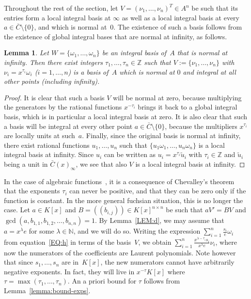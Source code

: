 \documentclass[final,1p,times,authoryear]{elsarticle}
\newtheorem{lemma}[theorem]{Lemma}
\let\set\mathbb
\begin{document}
Throughout the rest of the section, let $V = (\nu_1, \ldots, \nu_n)^T\in A^n$ be such that its entries
form a local integral basis at $\infty$ as well as a local integral basis at every $a\in\bar C\setminus\{0\}$,
and which is normal at~$0$.
The existence of such a basis follows from the existence of global integral bases that are normal at infinity,
as follows.

\begin{lemma}\label{LM:CB}
Let $W =\{\omega_1, \ldots, \omega_n\}$ be an integral basis of~$A$ that is normal at infinity. Then
there exist integers $\tau_1, \ldots, \tau_n\in\set Z$ such that
$V := \{\nu_1, \ldots, \nu_n\}$ with $\nu_i = x^{\tau_i} \omega_i$ ($i=1,\dots,n$)
is a basis of~$A$ which is normal at $0$ and integral at all other points (including infinity).
\end{lemma}
\begin{proof}
It is clear that such a basis $V$ will be normal at zero, because multiplying the generators by
the rational functions $x^{-\tau_i}$ brings it back to a global integral basis, which is in particular
a local integral basis at zero.
It is also clear that such a basis will be integral at every other point $a\in\bar C\setminus\{0\}$, because the
multipliers $x^{\tau_i}$ are locally units at such~$a$.
Finally, since the original basis is normal at infinity, there exist rational functions $u_1,\dots,u_n$
such that $\{u_1\omega_1,\dots,u_n\omega_n\}$ is a local integral basis at infinity.
Since $u_i$ can be written as $u_i=x^{\tau_i}\tilde{u}_i$ with $\tau_i\in\set Z$ and $\tilde{u}_i$ being a unit
in $\bar{C}(x)_\infty$, we see that also $V$ is a local integral basis at infinity.
\end{proof}

In the case of algebraic functions~\citep{chen16}, it is a consequence of Chevalley's theorem that the exponents
$\tau_i$ can never be positive, and that they can be zero only if the function is constant.
In the more general fuchsian situation, this is no longer the case.
Let $a\in K[x]$ and $B = ((b_{i, j}))\in K[x]^{n \times n}$ be such that $aV'=BV$ and
$\gcd(a, b_{1, 1}, b_{1, 2}, \ldots, b_{n ,n})=1$. By Lemma~\ref{LEM:d}, we may assume that
$a=x^\lambda e$ for some $\lambda\in\set N$, and we will do so. Writing the expression
$\sum_{i=1}^n\frac{s_i}{e}\omega_i$ from equation~\eqref{EQ:h} in terms of the basis~$V$,
we obtain $\sum_{i=1}^n\frac{x^{\lambda-\tau_i}s_i}{x^\lambda e}\nu_i$, where now
the numerators of the coefficients are Laurent polynomials. Note however that since
$s_1,\dots,s_n$ are in~$K[x]$, the new numerators cannot have arbitrarily negative exponents.
In fact, they will live in $x^{-\tau}K[x]$ where $\tau=\max(\tau_1,\dots,\tau_n)$.
An a priori bound for $\tau$ follows from Lemma~\ref{lemma:bound-exps}.
\end{document}
